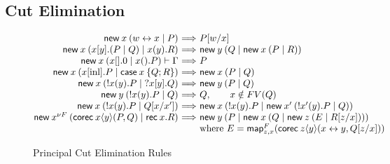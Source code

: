 \documentclass[orivec,envcountsame]{llncs}
\makeatletter
\newcommand{\cpbang}[1]{{! #1}}
\newcommand{\cptyp}[2]{#1 \vdash #2}
\newcommand{\mapname}{\mathsf{map}}
\newcommand{\map}[3]{\mapname^{#1}_{#2}(#3)}
\newcommand{\mkwd}[1]{\mathsf{#1}}
\newcommand{\link}[2]{#1 \leftrightarrow #2}
\newcommand{\cut}[4]{\mkwd{new}\:#1 \: (#3 \mid #4)}
\newcommand{\replicate}[2]{{!#1(#2)}}
\newcommand{\derelict}[2]{{?#1[#2]}}
\newcommand{\rec}[1]{\mkwd{rec}\:#1}
\newcommand{\corec}[5]{\mkwd{corec}\:#1 \langle #2 \rangle (#4,#5)}
\newcommand{\clabel}[1]{\mathrm{#1}}
\renewcommand{\case}[2]{\mkwd{case}\:#1\:\{#2\}}
\newcommand{\sel}[2]{#1[\clabel{#2}]}
\newcommand{\ba}{\begin{array}}
\newcommand{\ea}{\end{array}}
\newenvironment{equations}{\[\ba{@{}r@{~}c@{~}l@{}}}{\ea\]}
\makeatother
\begin{document}
\subsection{Cut Elimination}
\begin{figure}[float]
\small
\begin{equations}
\cut{x}{A}{\link{w}{x}}{P}
  &\Longrightarrow& P[w/x] \\
\cut{x}{A \otimes B}{x[y].(P \mid Q)}{x(y).R}
  &\Longrightarrow&
    \cut{y}{A}{Q}{\cut{x}{B}{P}{R}} \\
\cptyp{\cut{x}{1}{x[].0}{x().P}}{\Gamma}
  &\Longrightarrow&
    P \\
\cut{x}{A \oplus B}{\sel{x}{inl}.P}{\case{x}{Q;R}}
  &\Longrightarrow&
    \cut{x}{A}{P}{Q} \\
\cut{x}{\cpbang{A}}{\replicate{x}{y}.P}{\derelict{x}{y}.Q}
  &\Longrightarrow&
    \cut{y}{A}{P}{Q} \\
\cut{y}{\cpbang{A}}{\replicate{x}{y}.P}{Q}
  &\Longrightarrow&
     Q, \qquad x \notin FV(Q) \\
\cut{x}{\cpbang{A}}{\replicate{x}{y}.P}{Q[x/x']}
  &\Longrightarrow&
    \cut{x}{\cpbang{A}}{\replicate{x}{y}.P}{\cut{x'}{\cpbang{A}}{\replicate{x'}{y}.P}{Q}} \\
\cut{x^{\nu F}}{\nu F}{\corec{x}{y}{B}{P}{Q}}{\rec{x}.R}
  &\Longrightarrow&
    \cut{y}{B}{P}{\cut{x}{F(B)}{Q}{\cut{z}{F(\nu F)}{E}{R[z/x]}}} \\
&& \text{where }E = \map{F}{z,x}{\corec{z}{y}{B}{\link{x}{y}}{Q[z/x]}}
\end{equations}%

\caption{Principal Cut Elimination Rules}\label{fig:beta-reduction}
\end{figure}
\end{document}
